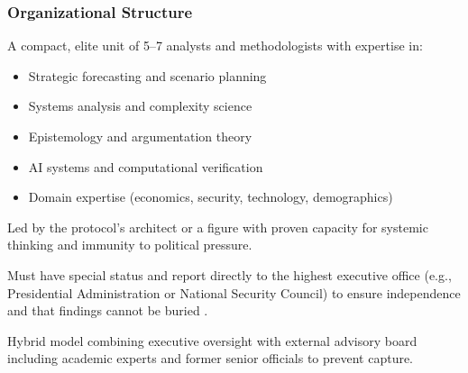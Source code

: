 \documentclass[11pt,a4paper]{article}
\begin{document}
\subsubsection{Organizational Structure}
\begin{description}[style=nextline]
    \item[\textbf{Core Team}] A compact, elite unit of 5--7 analysts and methodologists with expertise in:
    \begin{itemize}[nosep]
        \item Strategic forecasting and scenario planning
        \item Systems analysis and complexity science
        \item Epistemology and argumentation theory
        \item AI systems and computational verification
        \item Domain expertise (economics, security, technology, demographics)
    \end{itemize}
    
    \item[\textbf{Leadership}] Led by the protocol's architect or a figure with proven capacity for systemic thinking and immunity to political pressure.
    
    \item[\textbf{Reporting Structure}] Must have special status and report directly to the highest executive office (e.g., Presidential Administration or National Security Council) to ensure independence and that findings cannot be buried \citep[lines 775--776, 1036--1037, 1178--1180]{AnalyticalReport2025}.
    
    \item[\textbf{Governance}] Hybrid model combining executive oversight with external advisory board including academic experts and former senior officials to prevent capture.
\end{description}
\end{document}
